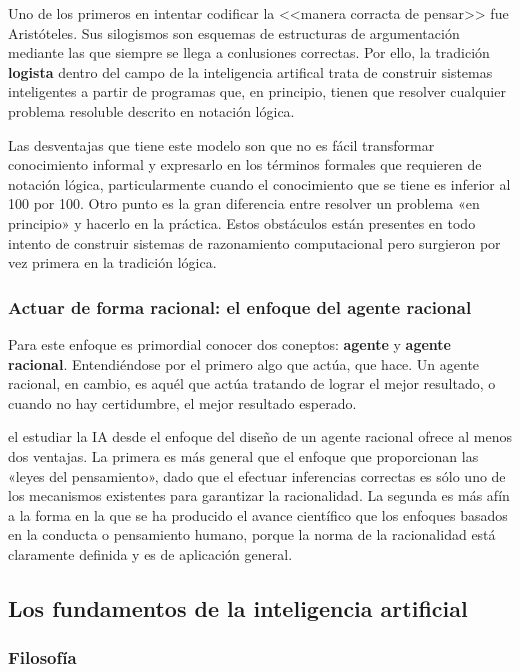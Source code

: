\documentclass{article}
\begin{document}
Uno de los primeros en intentar codificar la <<manera corracta de pensar>> fue Aristóteles. Sus silogismos son esquemas de estructuras de argumentación mediante las que siempre se llega a conlusiones correctas. Por ello, la tradición \textbf{logista} dentro del campo de la inteligencia artifical trata de construir sistemas inteligentes a partir de programas que, en principio, tienen que resolver cualquier problema resoluble descrito en notación lógica.

Las desventajas que tiene este modelo son que no es fácil transformar conocimiento informal y expresarlo en los términos formales que requieren de notación lógica, particularmente cuando el conocimiento que se tiene es inferior al 100 por 100. Otro punto es la gran diferencia entre resolver un problema «en principio» y hacerlo en la práctica. Estos obstáculos están presentes en todo intento de construir sistemas de razonamiento computacional pero surgieron por vez primera en la tradición lógica.

\subsubsection{Actuar de forma racional: el enfoque del agente racional}

Para este enfoque es primordial conocer dos coneptos: \textbf{agente} y \textbf{agente racional}. Entendiéndose por el primero algo que actúa, que hace. Un agente racional, en cambio, es aquél que actúa tratando de lograr el mejor resultado, o cuando no hay certidumbre, el mejor resultado esperado.

 el estudiar la IA desde el enfoque del diseño de un agente racional ofrece al menos dos ventajas. La primera es más general que el enfoque que proporcionan las «leyes del pensamiento», dado que el efectuar inferencias correctas es sólo uno de los mecanismos existentes para garantizar la racionalidad. La segunda es más afín a la forma en la que se ha producido el avance científico que los enfoques basados en la conducta o pensamiento humano, porque la norma de la racionalidad está claramente definida y es de aplicación general.

\subsection{Los fundamentos de la inteligencia artificial}

\subsubsection{Filosofía}
\end{document}
